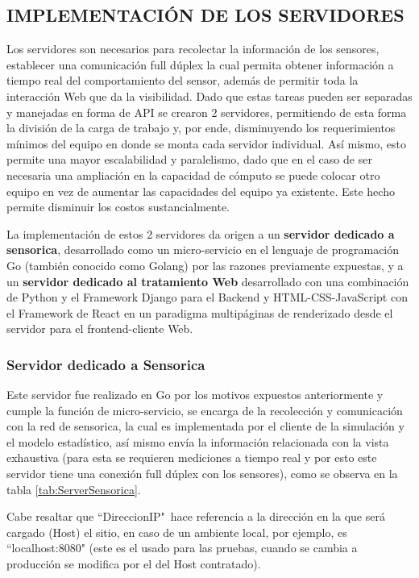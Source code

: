 \subsection{IMPLEMENTACIÓN DE LOS SERVIDORES}

    Los servidores son necesarios para recolectar la información de los sensores,
    establecer una comunicación full dúplex la cual permita obtener información
    a tiempo real del comportamiento del sensor, además de permitir toda la
    interacción Web que da la visibilidad. Dado que estas tareas pueden ser
    separadas y manejadas en forma de API se crearon 2 servidores, permitiendo
    de esta forma la división de la carga de trabajo y, por ende, disminuyendo los
    requerimientos mínimos del equipo en donde se monta cada servidor individual.
    Así mismo, esto permite una mayor escalabilidad y paralelismo, dado que en el
    caso de ser necesaria una ampliación en la capacidad de cómputo se puede colocar
    otro equipo en vez de aumentar las capacidades del equipo ya existente. Este
    hecho permite disminuir los costos sustancialmente.

    La implementación de estos 2 servidores da origen a un \textbf{servidor dedicado
    a sensorica}, desarrollado como un micro-servicio en el lenguaje de programación
    Go (también conocido como Golang) por las razones previamente expuestas, y
    a un \textbf{servidor dedicado al tratamiento Web} desarrollado con una
    combinación de Python y el Framework Django para el Backend y HTML-CSS-JavaScript
    con el Framework de React en un paradigma multipáginas de renderizado desde
    el servidor para el frontend-cliente Web.

    \subsubsection{Servidor dedicado a Sensorica}


    Este servidor fue realizado en Go por los motivos expuestos anteriormente y
    cumple la función de micro-servicio, se encarga de la recolección y comunicación
    con la red de sensorica, la cual es implementada por el cliente de la simulación
    y el modelo estadístico, así mismo envía la información relacionada con la
    vista exhaustiva (para esta se requieren mediciones a tiempo real y por esto
    este servidor tiene una conexión full dúplex con los sensores),
    como se observa en la tabla \ref{tab:ServerSensorica}.

    Cabe resaltar que ``DireccionIP"\ hace referencia a la dirección en la
    que será cargado (Host) el sitio, en caso de un ambiente local, por
    ejemplo, es ``localhost:8080" (este es el usado para las pruebas,
    cuando se cambia a producción se modifica por el del Host contratado).

